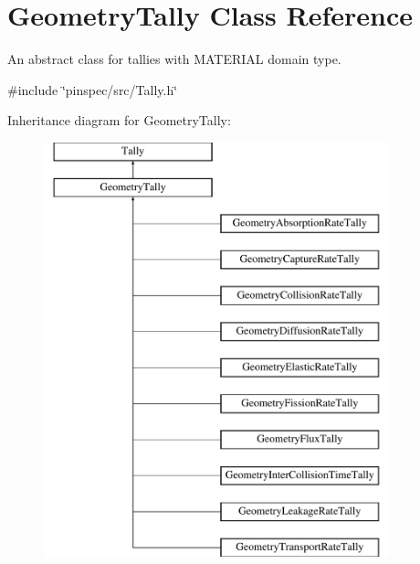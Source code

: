 \hypertarget{classGeometryTally}{\section{Geometry\-Tally Class Reference}
\label{classGeometryTally}
}


An abstract class for tallies with M\-A\-T\-E\-R\-I\-A\-L domain type.  




{\ttfamily \#include \char`\"{}pinspec/src/\-Tally.\-h\char`\"{}}

Inheritance diagram for Geometry\-Tally\-:\begin{figure}[H]
\begin{center}
\leavevmode
\includegraphics[height=12.000000cm]{classGeometryTally}
\end{center}
\end{figure}
